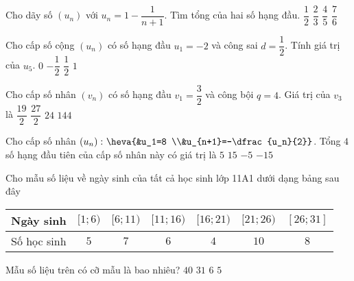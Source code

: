 \begin{ex}%
	Cho dãy số $\left(u_{n}\right)$ với $u_{n}=1-\dfrac{1}{n+1}$. Tìm tổng của hai số hạng đầu.
	\choice
	{$\dfrac{1}{2}$}
	{$\dfrac{2}{3}$}
	{$\dfrac{4}{5}$}
	{\True $\dfrac{7}{6}$}
\end{ex}

\begin{ex}%
	Cho cấp số cộng $\left(u_{n}\right)$ có số hạng đầu $u_{1}=-2$ và công sai $d=\dfrac{1}{2}$. Tính giá trị của $u_{5}$.
	\choice
	{\True $0$}
	{$-\dfrac{1}{2}$}
	{$\dfrac{1}{2}$}
	{$1$}
\end{ex}

\begin{ex}%
	Cho cấp số nhân $\left(v_{n}\right)$ có số hạng đầu $v_{1}=\dfrac{3}{2}$ và công bội $q=4$. Giá trị của $v_{3}$ là
	\choice
	{$\dfrac{19}{2}$}
	{$\dfrac{27}{2}$}
	{\True $24$}
	{$144$}
\end{ex}

\begin{ex}%
	Cho cấp số nhân $\left(u_n\right)\colon \heva{&u_1=8 \\&u_{n+1}=-\dfrac{u_n}{2}}$. Tổng $4$ số hạng đầu tiên của cấp số nhân này có giá trị là
	\choice
	{\True $5$}
	{$15$}
	{$-5$}
	{$-15$}
\end{ex}

\begin{ex}%
	Cho mẫu số liệu về ngày sinh của tất cả học sinh lớp 11A1 dưới dạng bảng sau đây
		\begin{center}
		\begin{tabular}{|l|c|c|c|c|c|c|}
			\hline
			Ngày sinh & $[1 ; 6)$ & $[6 ; 11)$ & $[11 ; 16)$ & $[16 ; 21)$ & $[21 ; 26)$ & $[26 ; 31]$ \\
			\hline
			Số học sinh & $5$ & $7$ & $6$ & $4$ & $10$ & $8$ \\
			\hline
		\end{tabular}
	\end{center}
	Mẫu số liệu trên có cỡ mẫu là bao nhiêu?
	\choice
	{\True $40$}
	{$31$}
	{$6$}
	{$5$}
\end{ex}

